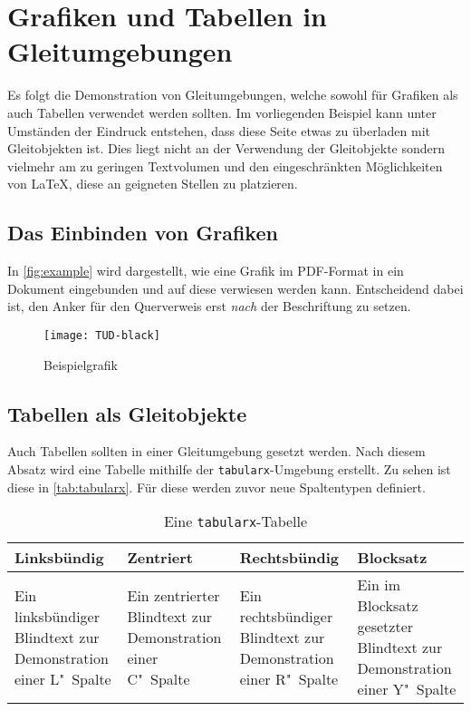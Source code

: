\documentclass[english,ngerman]{tudscrreprt}
\begin{document}
\section{Grafiken und Tabellen in Gleitumgebungen}
Es folgt die Demonstration von Gleitumgebungen, welche sowohl für Grafiken als
auch Tabellen verwendet werden sollten. Im vorliegenden Beispiel kann unter
Umständen der Eindruck entstehen, dass diese Seite etwas zu überladen mit
Gleitobjekten ist. Dies liegt nicht an der Verwendung der Gleitobjekte sondern
vielmehr am zu geringen Textvolumen und den eingeschränkten Möglichkeiten von
\LaTeX{}, diese an geigneten Stellen zu platzieren.
\subsection{Das Einbinden von Grafiken}
In \autoref{fig:example} wird dargestellt, wie eine Grafik im PDF-Format in ein
Dokument eingebunden und auf diese verwiesen werden kann. Entscheidend dabei
ist, den Anker für den Querverweis erst \emph{nach} der Beschriftung zu setzen.
\begin{figure}
\centering
\texttt{[image: TUD-black]}
\caption{Beispielgrafik}\label{fig:example}
\end{figure}
\subsection{Tabellen als Gleitobjekte}
Auch Tabellen sollten in einer Gleitumgebung gesetzt werden. Nach diesem Absatz
wird eine Tabelle mithilfe der \texttt{tabularx}-Umgebung erstellt. Zu sehen
ist diese in \autoref{tab:tabularx}. Für diese werden zuvor neue Spaltentypen
definiert.
\begin{table}
\begin{tabularx}{\textwidth}{@{}LCRY@{}}
\toprule
\textbf{Linksbündig} & \textbf{Zentriert} &
\textbf{Rechtsbündig} & \textbf{Blocksatz} \tabularnewline
\midrule
Ein linksbündiger Blindtext zur Demonstration einer L"~Spalte &
Ein zentrierter Blindtext zur Demonstration einer C"~Spalte &
Ein rechtsbündiger Blindtext zur Demonstration einer R"~Spalte &
Ein im Blocksatz gesetzter Blindtext zur Demonstration einer Y"~Spalte
\tabularnewline
\bottomrule
\end{tabularx}
\caption{Eine \texttt{tabularx}-Tabelle}\label{tab:tabularx}
\end{table}
\end{document}
